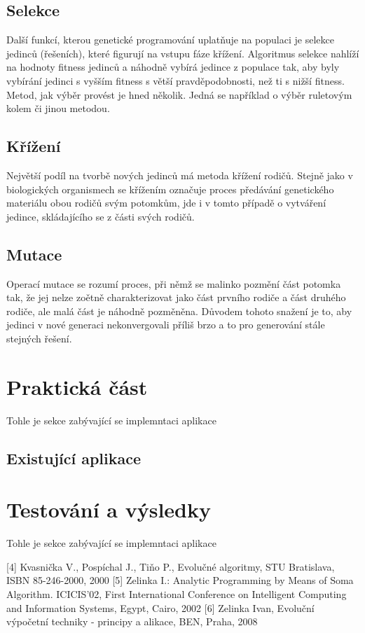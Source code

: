 \documentclass[bc,male,java,dept460]{diploma}		%
\begin{document}
\subsection{Selekce}
Další funkcí, kterou genetické programování uplatňuje na populaci je selekce jedinců (řešeních), které figurují na vstupu fáze křížení. Algoritmus selekce nahlíží na hodnoty fitness jedinců a náhodně vybírá jedince z populace tak, aby byly vybírání jedinci s vyšším fitness s větší pravděpodobnosti, než ti s nižší fitness.
Metod, jak výběr provést je hned několik. Jedná se například o výběr ruletovým kolem či jinou metodou.
\subsection{Křížení}
Největší podíl na tvorbě nových jedinců má metoda křížení rodičů. Stejně jako v biologických organismech se křížením označuje proces předávání genetického materiálu obou rodičů svým potomkům, jde i v tomto případě o vytváření jedince, skládajícího se z části svých rodičů.
\subsection{Mutace}
Operací mutace se rozumí proces, při němž se malinko pozmění část potomka tak, že jej nelze zoětně charakterizovat jako část prvního rodiče a část druhého rodiče, ale malá část je náhodně pozměněna. Důvodem tohoto snažení je to, aby jedinci v nové generaci nekonvergovali příliš brzo a to pro generování stále stejných řešení.

\section{Praktická část}
Tohle je sekce zabývající se implemntaci aplikace

\subsection{Existující aplikace}


\section{Testování a výsledky}
Tohle je sekce zabývající se implemntaci aplikace

[4] Kvasnička V., Pospíchal J., Tiňo P., Evolučné algoritmy, STU Bratislava, ISBN 85-246-2000, 2000
[5] Zelinka I.: Analytic Programming by Means of Soma Algorithm. ICICIS’02, First International Conference on Intelligent Computing and Information Systems, Egypt, Cairo, 2002
[6] Zelinka Ivan, Evoluční výpočetní techniky - principy a alikace, BEN, Praha, 2008 
\end{document}
